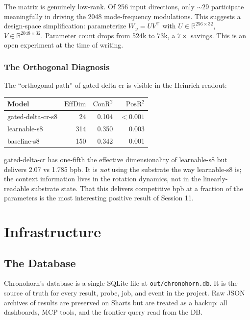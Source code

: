 \documentclass[11pt,openany]{book}
\theoremstyle{definition}
\theoremstyle{plain}
\newcommand{\effdim}{\mathrm{EffDim}}
\newcommand{\conr}{\mathrm{ConR^2}}
\newcommand{\posr}{\mathrm{PosR^2}}
\newcommand{\omegaproj}{W_\omega}
\begin{document}
The matrix is genuinely low-rank. Of 256 input directions, only $\sim
29$ participate meaningfully in driving the 2048 mode-frequency
modulations. This suggests a design-space simplification: parameterize
$\omegaproj = U V^\top$ with $U \in \mathbb{R}^{256 \times 32}$, $V \in
\mathbb{R}^{2048 \times 32}$. Parameter count drops from 524k to 73k,
a $7\times$ savings. This is an open experiment at the time of writing.

\section{The Orthogonal Diagnosis}

The ``orthogonal path'' of gated-delta-cr is visible in the Heinrich
readout:
\begin{center}
\begin{tabular}{lrrr}
\toprule
Model & $\effdim$ & $\conr$ & $\posr$ \\
\midrule
gated-delta-cr-s8 & 24 & 0.104 & $< 0.001$ \\
learnable-s8      & 314 & 0.350 & 0.003 \\
baseline-s8       & 150 & 0.342 & 0.001 \\
\bottomrule
\end{tabular}
\end{center}

gated-delta-cr has one-fifth the effective dimensionality of learnable-s8
but delivers 2.07 vs 1.785 bpb. It is \emph{not} using the substrate the
way learnable-s8 is; the context information lives in the rotation
dynamics, not in the linearly-readable substrate state. That this delivers
competitive bpb at a fraction of the parameters is the most interesting
positive result of Session 11.

\part{Infrastructure}

\chapter{The Database}
\label{ch:database}

Chronohorn's database is a single SQLite file at \texttt{out/chronohorn.db}.
It is the source of truth for every result, probe, job, and event in the
project. Raw JSON archives of results are preserved on Sharts but are
treated as a backup: all dashboards, MCP tools, and the frontier query
read from the DB.
\end{document}
